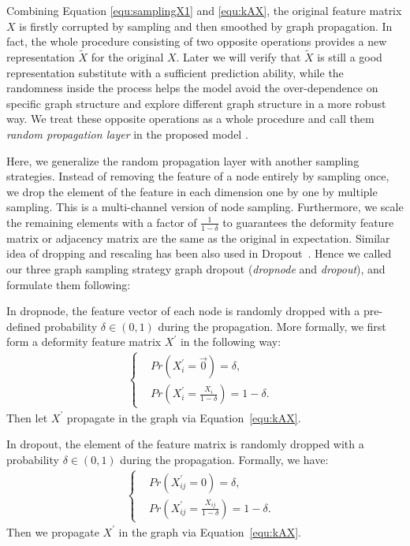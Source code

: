 {{Combining Equation \ref{equ:samplingX1} and \ref{equ:kAX}, the original feature matrix $X$ is firstly  corrupted by sampling and then smoothed by graph propagation. In fact, the whole procedure consisting of two opposite operations provides a new representation $\widetilde{X}$ for the original $X$. Later we will verify that $\widetilde{X}$ is still a good representation substitute with a sufficient prediction ability, while the randomness inside the process helps the model avoid the over-dependence on specific graph structure and 
explore different graph structure in a more robust way.
We treat these opposite operations as a whole procedure and call them \textit{random propagation layer} in the proposed model \model. 

Here, we generalize the random propagation layer with another sampling strategies. Instead of removing the feature of a node entirely by sampling once, we drop the element of the feature in each dimension one by one by multiple sampling. This is a multi-channel version of node sampling. Furthermore, we scale the remaining elements with a factor of $\frac{1}{1-\delta}$ to 
 guarantees the deformity feature matrix or adjacency matrix are the same as the original in expectation. Similar idea of dropping and rescaling has been also used in Dropout~\cite{srivastava2014dropout}. Hence we called our three graph sampling strategy graph dropout (\textit{dropnode} and \textit{dropout}), and formulate them following:
 
 In dropnode, the feature vector of each node is randomly dropped with a pre-defined probability $\delta \in (0,1)$ during the propagation. More formally, we first form a deformity feature matrix $X^{'}$ in the following way:
\begin{align}
\label{equ:nodedropout}
\left\{
\begin{aligned}
& Pr(X^{'}_{i}=\vec{0}) = \delta,& \\
&Pr(X^{'}_{i}= \frac{X_i}{1-\delta} ) = 1- \delta. &
\end{aligned}
\right.
\end{align}
Then let $X^{'}$ propagate in the graph via Equation~\ref{equ:kAX}. 

 In dropout, the element of the feature matrix is randomly dropped with a probability $\delta \in (0,1)$ during the propagation. Formally, we have:
\begin{align}
\label{equ:featuredropout}
\left\{
\begin{aligned}
& Pr(X^{'}_{ij}=0) = \delta,& \\
&Pr(X^{'}_{ij}= \frac{X_{ij}}{1-\delta} ) = 1- \delta. &
\end{aligned}
\right.
\end{align}
Then we  propagate $X^{'}$ in the graph via Equation~\ref{equ:kAX}. 



}}
